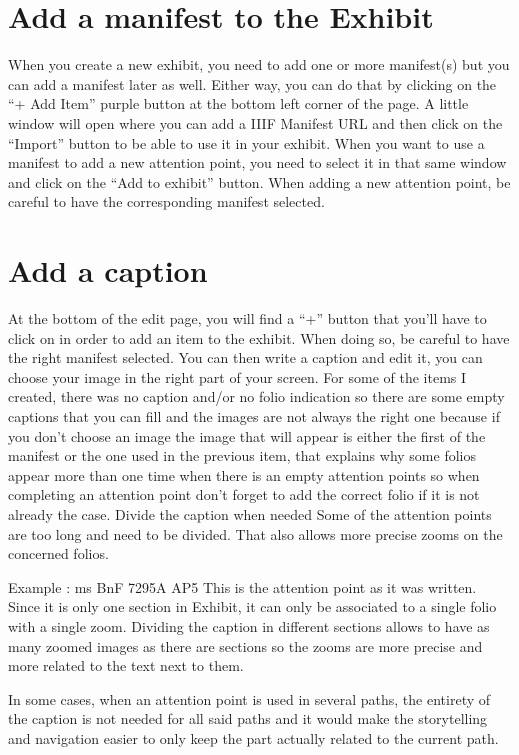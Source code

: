 \documentclass{article}
\begin{document}
    \section{Add a manifest to the Exhibit}
    When you create a new exhibit, you need to add one or more manifest(s) but you can add a manifest later as well. Either way, you can do that by clicking on the “+ Add Item” purple button at the bottom left corner of the page. A little window will open where you can add a IIIF Manifest URL and then click on the “Import” button to be able to use it in your exhibit. When you want to use a manifest to add a new attention point, you need to select it in that same window and click on the “Add to exhibit” button. When adding a new attention point, be careful to have the corresponding manifest selected. 

    \section{Add a caption}
    At the bottom of the edit page, you will find a “+” button that you’ll have to click on in order to add an item to the exhibit. When doing so, be careful to have the right manifest selected. You can then write a caption and edit it, you can choose your image in the right part of your screen. 
    For some of the items I created, there was no caption and/or no folio indication so there are some empty captions that you can fill and the images are not always the right one because if you don’t choose an image the image that will appear is either the first of the manifest or the one used in the previous item, that explains why some folios appear more than one time when there is an empty attention points so when completing an attention point don’t forget to add the correct folio if it is not already the case. 
    Divide the caption when needed
    Some of the attention points are too long and need to be divided. That also allows more precise zooms on the concerned folios.

    Example : ms BnF 7295A AP5
    This is the attention point as it was written. Since it is only one section in Exhibit, it can only be associated to a single folio with a single zoom. Dividing the caption in different sections allows to have as many zoomed images as there are sections so the zooms are more precise and more related to the text next to them. 

    In some cases, when an attention point is used in several paths, the entirety of the caption is not needed for all said paths and it would make the storytelling and navigation easier to only keep the part actually related to the current path.  
\end{document}
